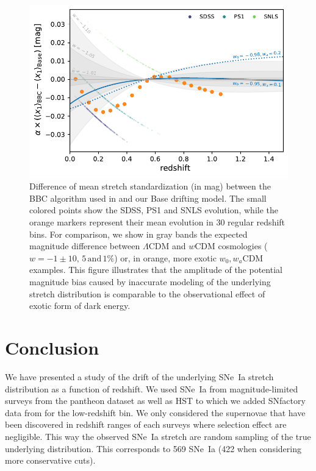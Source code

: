 \documentclass[]{aa} %
\newcommand{\nn}[1]{{\textcolor[rgb]{1, 0.27, 0}{#1}}}
\begin{document}
\begin{figure}
    \centering
    \includegraphics[width=\linewidth]{Article_figures/BBC_distmod_w0wa.pdf}
    \caption{Difference of mean stretch standardization (in mag) between the BBC
        algorithm used in \cite{scolnic2018a} and our Base drifting model.
        \nn{The small colored points show the SDSS, PS1 and SNLS evolution,
            while the orange markers represent their mean evolution in 30
            regular redshift bins.} For comparison, we show in gray bands the
            expected magnitude difference between $\Lambda$CDM and $w$CDM
            cosmologies ($w=-1\pm 10,\,5\,\mathrm{and}\,1\%$) or, in orange,
            more exotic $w_0,w_a$CDM examples. This figure illustrates that the
            amplitude of the potential magnitude bias caused by inaccurate
        modeling of the underlying stretch distribution is comparable to the
    observational effect of exotic form of dark energy.}
    \label{fig:magdrift}
\end{figure}

\section{Conclusion}
\label{sec:ccl}
We have presented a study of the drift of the underlying SNe~Ia stretch
distribution as a function of redshift. We used SNe~Ia from magnitude-limited
surveys from the pantheon dataset \citep[][SDSS, PS1 and SNLS]{scolnic2018a} as
well as HST to which we added SNfactory data from \cite{rigault2018} for the
low-redshift bin. We only considered the supernovae that have been discovered
in redshift ranges of each surveys where selection effect are negligible. This
way the observed SNe~Ia stretch are random sampling of the true underlying
distribution. This corresponds to 569 SNe~Ia (422 when considering more
conservative cuts).
\end{document}
